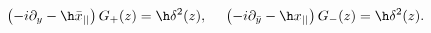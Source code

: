 \begin{equation}
\left(-i\partial_{y}-\h\bar x_{||}\right)G_+(z)
=\h\delta^2(z),~~~~
\left(-i\partial_{\bar y}-\h x_{||}\right)
G_-(z)=\h\delta^2(z).
\end{equation}

